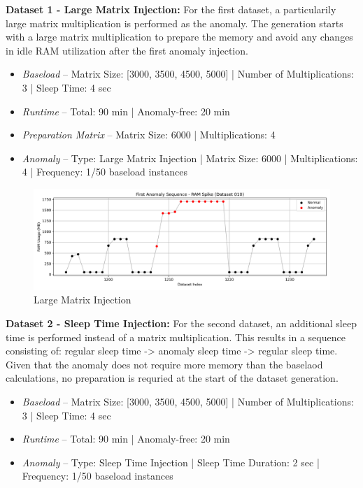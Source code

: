 \documentclass[12pt,oneside]{article}
\begin{document}
\textbf{Dataset 1 - Large Matrix Injection:} For the first dataset, a particularily large matrix multiplication is performed as the anomaly. The generation starts with a large matrix multiplication to prepare the memory and avoid any changes in idle RAM utilization after the first anomaly injection. 
\begin{itemize}
    \item \textit{Baseload} -- Matrix Size: [3000, 3500, 4500, 5000] | Number of Multiplications: 3 | Sleep Time: 4 sec
    \item \textit{Runtime} -- Total: 90 min | Anomaly-free: 20 min 
    \item \textit{Preparation Matrix} -- Matrix Size: 6000 | Multiplications: 4
    \item \textit{Anomaly} -- Type: Large Matrix Injection | Matrix Size: 6000 | Multiplications: 4 | Frequency: 1/50 baseload instances
\end{itemize}

\begin{figure}[H] %
    \centering %
    \includegraphics[width=\textwidth]{anomaly_sequence_10}
    \caption{Large Matrix Injection}
    \label{fig:anomaly_10} %
\end{figure}


\textbf{Dataset 2 - Sleep Time Injection:} For the second dataset, an additional sleep time is performed instead of a matrix multiplication. This results in a sequence consisting of: regular sleep time -> anomaly sleep time -> regular sleep time. Given that the anomaly does not require more memory than the baselaod calculations, no preparation is requried at the start of the dataset generation.
\begin{itemize}
    \item \textit{Baseload} -- Matrix Size: [3000, 3500, 4500, 5000] | Number of Multiplications: 3 | Sleep Time: 4 sec
    \item \textit{Runtime} -- Total: 90 min | Anomaly-free: 20 min 
    \item \textit{Anomaly} -- Type: Sleep Time Injection | Sleep Time Duration: 2 sec | Frequency: 1/50 baseload instances
\end{itemize}
\end{document}
